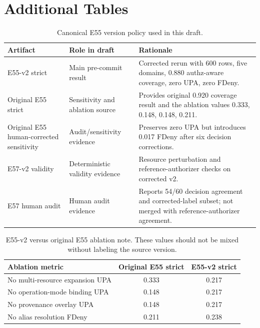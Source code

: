 \section{Additional Tables}

\begin{table}[h]
\centering
\small
\caption{Canonical E55 version policy used in this draft.}
\label{tab:e55-version-policy}
\begin{tabularx}{\textwidth}{l l X}
\toprule
Artifact & Role in draft & Rationale \\
\midrule
E55-v2 strict & Main pre-commit result & Corrected rerun with 600 rows, five domains, 0.880 authz-aware coverage, zero UPA, zero FDeny. \\
Original E55 strict & Sensitivity and ablation source & Provides original 0.920 coverage result and the ablation values 0.333, 0.148, 0.148, 0.211. \\
Original E55 human-corrected sensitivity & Audit/sensitivity evidence & Preserves zero UPA but introduces 0.017 FDeny after six decision corrections. \\
E57-v2 validity & Deterministic validity evidence & Resource perturbation and reference-authorizer checks on corrected v2. \\
E57 human audit & Human audit evidence & Reports 54/60 decision agreement and corrected-label subset; not merged with reference-authorizer agreement. \\
\bottomrule
\end{tabularx}
\end{table}

\begin{table}[h]
\centering
\small
\caption{E55-v2 versus original E55 ablation note. These values should not be mixed without labeling the source version.}
\label{tab:e55-v2-ablation-note}
\begin{tabular}{lcc}
\toprule
Ablation metric & Original E55 strict & E55-v2 strict \\
\midrule
No multi-resource expansion UPA & 0.333 & 0.217 \\
No operation-mode binding UPA & 0.148 & 0.217 \\
No provenance overlay UPA & 0.148 & 0.217 \\
No alias resolution FDeny & 0.211 & 0.238 \\
\bottomrule
\end{tabular}
\end{table}


